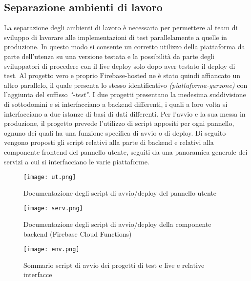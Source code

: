 \subsection{Separazione ambienti di lavoro}
La separazione degli ambienti di lavoro è necessaria per permettere al team di sviluppo di lavorare alle implementazioni di test parallelamente a quelle in produzione. In questo modo si consente un corretto utilizzo della piattaforma da parte dell'utenza su una versione testata e la possibilità da parte degli sviluppatori di procedere con il live deploy solo dopo aver testato il deploy di test. Al progetto vero e proprio Firebase-hosted ne è stato quindi affiancato un altro parallelo, il quale presenta lo stesso identificativo \textit{(piattaforma-garzone)} con l'aggiunta del suffisso \textit{"-test"}. I due progetti presentano la medesima suddivisione di sottodomini e si interfacciano a backend differenti, i quali a loro volta si interfacciano a due istanze di basi di dati differenti.
Per l'avvio e la sua messa in produzione, il progetto prevede l'utilizzo di script appositi per ogni pannello, ognuno dei quali ha una funzione specifica di avvio o di deploy. Di seguito vengono proposti gli script relativi alla parte di backend e relativi alla componente frontend del pannello utente, seguiti da una panoramica generale dei servizi a cui si interfacciano le varie piattaforme.
\begin{figure}[!htb]
    \centering
    \texttt{[image: ut.png]}
    \caption{Documentazione degli script di avvio/deploy del pannello utente}
\end{figure}
\begin{figure}[!htb]
    \centering
    \texttt{[image: serv.png]}
    \caption{Documentazione degli script di avvio/deploy della componente backend (Firebase Cloud Functions)}
\end{figure}

\begin{figure}[!htb]
    \centering
    \texttt{[image: env.png]}
    \caption{Sommario script di avvio dei progetti di test e live e relative interfacce}
\end{figure}
